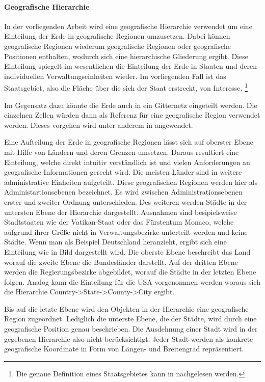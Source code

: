 		\paragraph*{Geografische Hierarchie} \label{par: geografische Hierarchie} 
		In der vorliegenden Arbeit wird eine geografische Hierarchie verwendet um eine Einteilung der Erde in geografische Regionen umzusetzen.
		Dabei können geografische Regionen wiederum geografische Regionen oder geografische Positionen enthalten, wodurch sich eine hierarchische Gliederung ergibt.
		Diese Einteilung spiegelt im wesentlichen die Einteilung der Erde in Staaten und deren individuellen Verwaltungseinheiten wieder.
		Im vorliegenden Fall ist das Staatsgebiet, also die Fläche über die sich der Staat erstreckt, von Interesse. \footnote{Die genaue Definition eines Staatsgebietes kann in \cite{jellinek1921} nachgelesen werden.} 

		Im Gegensatz dazu könnte die Erde auch in ein Gitternetz eingeteilt werden. 
		Die einzelnen Zellen würden dann als Referenz für eine geografische Region verwendet werden.
		Dieses vorgehen wird unter anderem in \cite{Serdyukov2009} angewendet.

		Eine Aufteilung der Erde in geografische Regionen lässt sich auf oberster Ebene mit Hilfe von Ländern und deren Grenzen umsetzen. 
		Daraus resultiert eine Einteilung, welche direkt intuitiv verständlich ist und vielen Anforderungen an geografische Informationen gerecht wird.
		Die meisten Länder sind in weitere administrative Einheiten aufgeteilt.
		Diese geografischen Regionen werden hier als Administartionsebenen bezeichnet.
		Es wird zwischen Administrationsebenen erster und zweiter Ordnung unterschieden. 
		Des weiteren werden Städte in der untersten Ebene der Hierarchie dargestellt.
		Ausnahmen sind besipielsweise Stadtstaaten wie der Vatikan-Staat oder das Fürstentum Monaco, welche aufgrund ihrer Größe nicht in Verwaltungsbezirke unterteilt werden und keine Städte.
		Wenn man als Beispiel Deutschland heranzieht, ergibt sich eine Einteilung wie in Bild  dargestellt wird.
		Die oberste Ebene beschreibt das Land worauf die zweite Ebene die Bundesländer darstellt.
		Auf der dritten Ebene werden die Regierungsbezirke abgebildet, worauf die Städte in der letzten Ebene folgen. 
		Analog kann die Einteilung für die USA vorgenommen werden woraus sich die Hierarchie Country->State->County->City ergibt.

		Bis auf die letzte Ebene wird den Objekten in der Hierarchie eine geografische Region zugeordnet. 
		Lediglich die unterste Ebene, die der Städte, wird durch eine geografische Position genau beschrieben. 
		Die Ausdehnung einer Stadt wird in der gegebenen Hierarchie also nicht berücksichtigt. 
		Jeder Stadt werden als konkrete geografische Koordinate in Form von Längen- und Breitengrad repräsentiert. 

